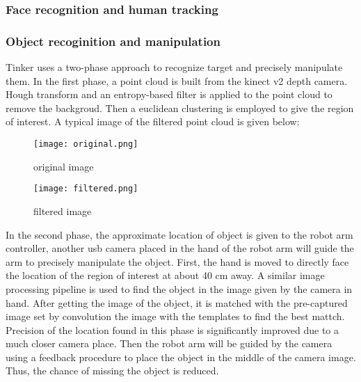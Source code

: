 \subsubsection{Face recognition and human tracking}
\subsubsection{Object recoginition and manipulation}
Tinker uses a two-phase approach to recognize target and precisely manipulate them. In the first phase, a point cloud is built from the kinect v2 depth camera. Hough transform and an entropy-based filter is applied to the point cloud to remove the backgroud. Then a euclidean clustering is employed to give the region of interest. A typical image of the filtered point cloud is given below:
\begin{figure}[H]
    \texttt{[image: original.png]}
    \caption{original image}
\end{figure}

\begin{figure}[H]
    \texttt{[image: filtered.png]}
    \caption{filtered image}
\end{figure}

In the second phase, the approximate location of object is given to the robot arm controller, another usb camera placed in the hand of the robot arm will guide the arm to precisely manipulate the object. First, the hand is moved to directly face the location of the region of interest at about 40 cm away. A similar image processing pipeline is used to find the object in the image given by the camera in hand. After getting the image of the object, it is matched with the pre-captured image set by convolution the image with the templates to find the best mattch. Precision of the location found in this phase is significantly improved due to a much closer camera place. Then the robot arm will be guided by the camera using a feedback procedure to place the object in the middle of the camera image. Thus, the chance of missing the object is reduced.

